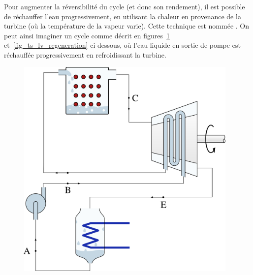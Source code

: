		Pour augmenter la réversibilité du cycle (et donc son rendement), il est possible de réchauffer l’eau progressivement, en utilisant la chaleur en provenance de la turbine (où la température de la vapeur varie). Cette technique est nommée . On peut ainsi imaginer un cycle comme décrit en figures~\ref{fig_circuit_regeneration} et~\ref{fig_ts_lv_regeneration} ci-dessous, où l’eau liquide en sortie de pompe est réchauffée progressivement en refroidissant la turbine.

		\begin{figure}
			\begin{center}
				\includegraphics[height=11cm]{images/circuit_regeneration.png}
			\end{center}
			\label{fig_circuit_regeneration}
		\end{figure}


